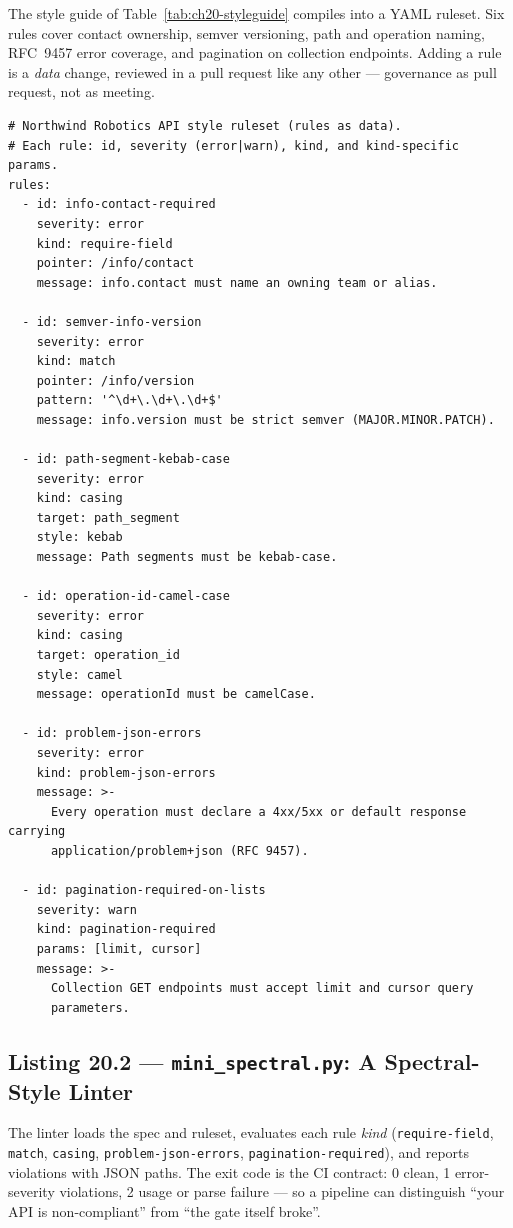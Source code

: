 The style guide of Table~\ref{tab:ch20-styleguide} compiles into a YAML
ruleset. Six rules cover contact ownership, semver versioning, path and
operation naming, RFC~9457 error coverage, and pagination on collection
endpoints. Adding a rule is a \emph{data} change, reviewed in a pull
request like any other --- governance as pull request, not as meeting.

\begin{verbatim}
# Northwind Robotics API style ruleset (rules as data).
# Each rule: id, severity (error|warn), kind, and kind-specific params.
rules:
  - id: info-contact-required
    severity: error
    kind: require-field
    pointer: /info/contact
    message: info.contact must name an owning team or alias.

  - id: semver-info-version
    severity: error
    kind: match
    pointer: /info/version
    pattern: '^\d+\.\d+\.\d+$'
    message: info.version must be strict semver (MAJOR.MINOR.PATCH).

  - id: path-segment-kebab-case
    severity: error
    kind: casing
    target: path_segment
    style: kebab
    message: Path segments must be kebab-case.

  - id: operation-id-camel-case
    severity: error
    kind: casing
    target: operation_id
    style: camel
    message: operationId must be camelCase.

  - id: problem-json-errors
    severity: error
    kind: problem-json-errors
    message: >-
      Every operation must declare a 4xx/5xx or default response carrying
      application/problem+json (RFC 9457).

  - id: pagination-required-on-lists
    severity: warn
    kind: pagination-required
    params: [limit, cursor]
    message: >-
      Collection GET endpoints must accept limit and cursor query
      parameters.
\end{verbatim}

\subsection{Listing 20.2 --- \texttt{mini\_spectral.py}: A Spectral-Style Linter}
\label{sec:ch20-listing-linter}

The linter loads the spec and ruleset, evaluates each rule \emph{kind}
(\texttt{require-field}, \texttt{match}, \texttt{casing},
\texttt{problem-json-errors}, \texttt{pagination-required}), and reports
violations with JSON paths. The exit code is the CI contract: 0 clean, 1
error-severity violations, 2 usage or parse failure --- so a pipeline can
distinguish ``your API is non-compliant'' from ``the gate itself broke''.

